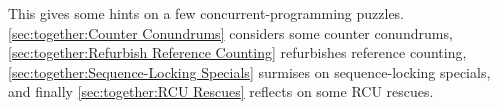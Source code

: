 
%


This 
gives some hints on a few concurrent-programming puzzles.
\cref{sec:together:Counter Conundrums}
considers some counter conundrums,
\cref{sec:together:Refurbish Reference Counting}
refurbishes reference counting,
\cref{sec:together:Sequence-Locking Specials}
surmises on sequence-locking specials,
and finally
\cref{sec:together:RCU Rescues}
reflects on some RCU rescues.







